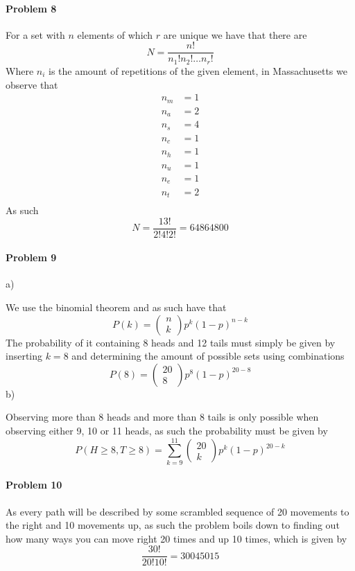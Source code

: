 \paragraph{Problem 8}
For a set with $n$ elements of which $r$ are unique we have that there are
\[
    N=\frac{n!}{n_{1}!n_{2}!\ldots n_{r}!}
\]
Where $n_{i}$ is the amount of repetitions of the given element, in Massachusetts we observe that
\begin{align*}
    n_{m}&=1 \\
    n_{a}&=2 \\
    n_{s}&=4 \\
    n_{c}&=1 \\
    n_{h}&=1 \\
    n_{u}&=1 \\
    n_{e}&=1 \\
    n_{t}&=2 \\
\end{align*}
As such
\[
    N=\frac{13!}{2!4!2!}=64864800
\]
\paragraph{Problem 9}
a)

We use the binomial theorem and as such have that
\[
    P(k)=\begin{pmatrix}n\\k\end{pmatrix}p^{k}(1-p)^{n-k}
\]
The probability of it containing 8 heads and 12 tails must simply be given by inserting $k=8$ and determining the amount of possible sets using combinations
\[
    P(8)=\begin{pmatrix}20\\8\end{pmatrix}p^{8}(1-p)^{20-8}
\]
b)

Observing more than 8 heads and more than 8 tails is only possible when observing either 9, 10 or 11 heads, as such the probability must be given by
\[
    P(H\geq 8, T\geq 8)=\sum_{k=9}^{11}\begin{pmatrix}20\\k\end{pmatrix}p^{k}(1-p)^{20-k}
\]
\paragraph{Problem 10}
As every path will be described by some scrambled sequence of 20 movements to the right and 10 movements up, as such the problem boils down to finding out how many ways you can move right 20 times and up 10 times, which is given by
\[
    \frac{30!}{20!10!}=30045015
\]
